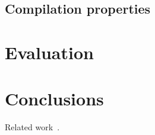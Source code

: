 \documentclass{article}
\begin{document}
\subsection{Compilation properties}



\section{Evaluation}

\section{Conclusions}
Related work~\cite{SternJ17}.




\end{document}
